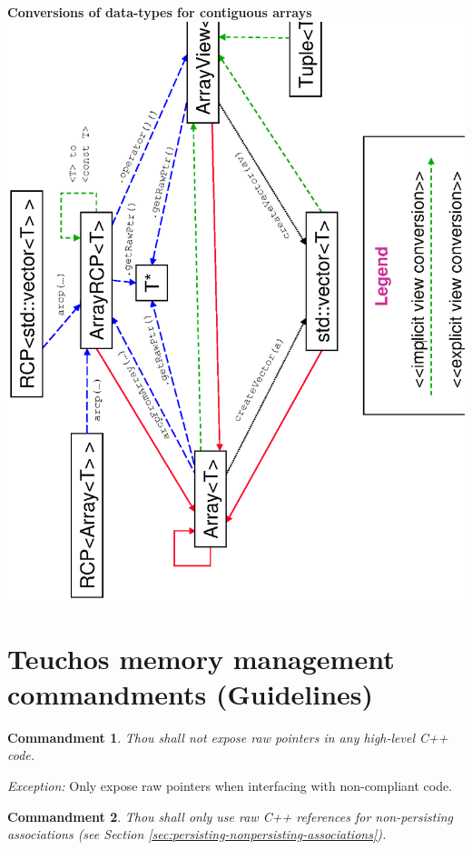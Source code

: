 \documentclass[pdf,ps2pdf,11pt]{SANDreport}
\newtheorem{commandment}{Commandment}
\begin{document}
\begin{center}
{}\textbf{Conversions of data-types for contiguous arrays}
\includegraphics*[angle=270,scale=0.65]{TeuchosArrayConversions}


\end{center}


%
{}\section{Teuchos memory management commandments (Guidelines)}
\label{apdx:commandments}
%

\begin{commandment}
Thou shall not expose raw pointers in any high-level C++ code.
\end{commandment}

{}\textit{Exception:} Only expose raw pointers when interfacing with
non-compliant code.

\begin{commandment}
Thou shall only use raw C++ references for non-persisting associations
(see Section {}\ref{sec:persisting-nonpersisting-associations}).
\end{commandment}
\end{document}
